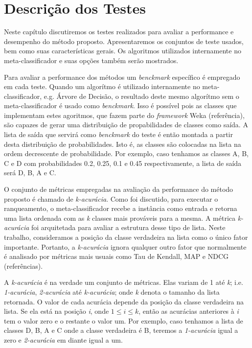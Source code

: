 \chapter{Descrição dos Testes}

Neste capítulo discutiremos os testes realizados para avaliar a performance e desempenho do método proposto.
Apresentaremos os conjuntos de teste usados, bem como suas características gerais. 
Os algoritmos utilizados internamente no meta-classificador e suas opções também serão mostrados.

Para avaliar a performance dos métodos um \textit{benckmark} específico é empregado em cada teste.
Quando um algorítmo é utilizado internamente no meta-classificador, e.g. Árvore de Decisão, o resultado deste mesmo algorítmo sem o meta-classificador é usado como \textit{benckmark}.
Isso é possível pois as classes que implementam estes agoritmos, que fazem parte do \textit{framework} Weka (referência), são capazes de gerar uma distribuição de propabilidades de classes como saída.
A lista de saída que servirá como \textit{benckmark} do teste é então montada a partir desta distribuição de probabilidades.
Isto é, as classes são colocadas na lista na ordem decrescente de probabilidade.
Por exemplo, caso tenhamos as classes A, B, C e D com probabilidades 0.2, 0.25, 0.1 e 0.45 respectivamente, a lista de saída será D, B, A e C.

O conjunto de métricas empregadas na avaliação da performance do método proposto é chamado de \textit{k-acurácia}. 
Como foi discutido, para executar o ranqueamento, o meta-classificador recebe a instância como entrada e retorna uma lista ordenada com as \textit{k} classes mais prováveis para a mesma.
A métrica \textit{k-acurácia} foi arquitetada para avaliar a estrutura desse tipo de lista.
Neste trabalho, consideramos a posição da classe verdadeira na lista como o único fator importante.
Portanto, a \textit{k-acurácia} ignora qualquer outro fator que normalmente é analisado por métricas mais usuais como Tau de Kendall, MAP e NDCG (referências).

A \textit{k-acurácia} é na verdade um conjunto de métricas. 
Elas variam de 1 até \textit{k}; i.e. \textit{1-acurácia}, \textit{2-acurácia} até \textit{k-acurácia}; onde \textit{k} denota o tamanho da lista retornada.
O valor de cada acurácia depende da posição da classe verdadeira na lista.
Se ela está na posição \textit{i}, onde $1 \leq \textit{i} \leq \textit{k}$, então as acurácias anteriores à \textit{i} tem o valor zero e o restante o valor um.
Por exemplo, caso tenhamos a lista de classes D, B, A e C onde a classe verdadeira é B, teremos a \textit{1-acurácia} igual a zero e \textit{2-acurácia} em diante igual a um.

